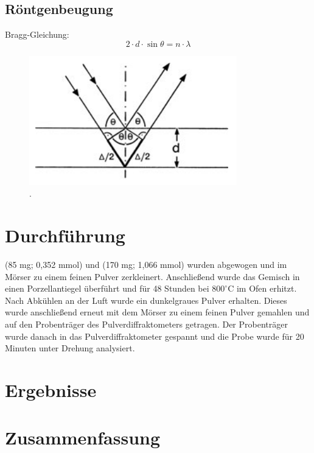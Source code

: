 \documentclass[a4paper,12pt,bibliography=totocnumbered]{scrartcl}
\begin{document}
\subsection{Röntgenbeugung}

Bragg-Gleichung:
\begin{equation}
    2 \cdot d \cdot \sin \theta = n \cdot \lambda
    \label{Bragg}
\end{equation}

\begin{figure}[H]
    \centering
    \includegraphics[scale=0.95]{Bilder/Bragg.png}
    \caption{. \cite{Kristallgitter}}
    \label{fig: Bragg}
\end{figure}

\newpage

\section{Durchführung}
(85 mg; 0,352 mmol) und (170 mg; 1,066 mmol) wurden abgewogen und im Mörser zu einem feinen Pulver zerkleinert. 
Anschließend wurde das Gemisch in einen Porzellantiegel überführt und für 48 Stunden bei $800 ^\circ$C im Ofen erhitzt.\\
Nach Abkühlen an der Luft wurde ein dunkelgraues Pulver erhalten. 
Dieses wurde anschließend erneut mit dem Mörser zu einem feinen Pulver gemahlen und auf den Probenträger des Pulverdiffraktometers getragen. 
Der Probenträger wurde danach in das Pulverdiffraktometer gespannt und die Probe wurde für 20 Minuten unter Drehung analysiert.

\section{Ergebnisse}




\cite{FeDiff}

\section{Zusammenfassung}



\printbibliography[title={Literatur}]
\end{document}
